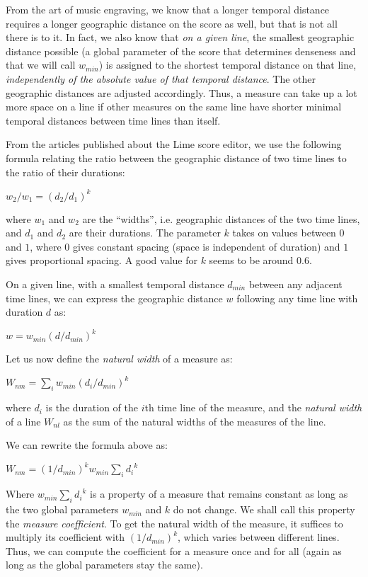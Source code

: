 \documentclass[11pt]{book}
\begin{document}
From the art of music engraving, we know that a longer temporal
distance requires a longer geographic distance on the score as well,
but that is not all there is to it.  In fact, we also know that
\emph{on a given line}, the smallest geographic distance possible (a
global parameter of the score that determines denseness and that we
will call $w_{min}$) is assigned to the shortest temporal distance on
that line, \emph{independently of the absolute value of that temporal
distance}. The other geographic distances are adjusted accordingly.
Thus, a measure can take up a lot more space on a line if other
measures on the same line have shorter minimal temporal distances
between time lines than itself.

From the articles published about the Lime score editor, we use the
following formula relating the ratio between the geographic distance
of two time lines to the ratio of their durations:

$w_2 / w_1 = {(d_2 / d_1)}^k$

where $w_1$ and $w_2$ are the ``widths'', i.e. geographic distances of
the two time lines, and $d_1$ and $d_2$ are their durations. The
parameter $k$ takes on values between $0$ and $1$, where $0$ gives
constant spacing (space is independent of duration) and $1$ gives
proportional spacing.  A good value for $k$ seems to be around $0.6$. 

On a given line, with a smallest temporal distance $d_{min}$ between
any adjacent time lines, we can express the geographic distance
$w$ following any time line with duration $d$ as:

$w = w_{min} {(d / d_{min})}^k$

Let us now define the \emph{natural width} of a measure as:

$W_{nm} = \sum_i w_{min} {(d_i / d_{min})}^k$

where $d_i$ is the duration of the $i$th time line of the measure, and
the \emph{natural width} of a line $W_{nl}$ as the sum of the natural
widths of the measures of the line.  

We can rewrite the formula above as:

$W_{nm} = {(1 / d_{min})}^k w_{min}  \sum_i {d_i}^k$

Where $w_{min}  \sum_i {d_i}^k$ is a property of a measure that
remains constant as long as the two global parameters $w_{min}$ and
$k$ do not change.  We shall call this property the \emph{measure
coefficient}.  To get the natural width of the measure, it suffices to
multiply its coefficient with ${(1 / d_{min})}^k$, which varies
between different lines.  Thus, we can compute the coefficient for a
measure once and for all (again as long as the global parameters stay
the same). 
\end{document}
